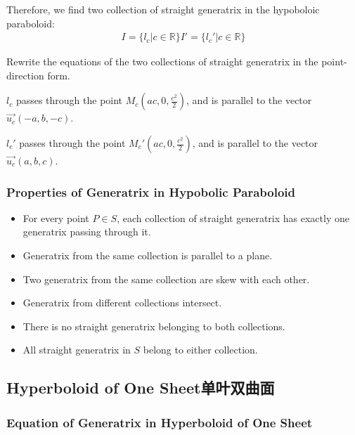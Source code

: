 \documentclass[onecolumn]{ctexart}
\begin{document}
Therefore, we find two collection of straight generatrix in the hypoboloic 
paraboloid:
\begin{equation}
  \begin{split}
    I = \lbrace l_c | c \in \mathbb{R} \rbrace
    I' = \lbrace l_c' | c \in \mathbb{R} \rbrace
  \end{split}
\end{equation}

Rewrite the equations of the two collections of straight generatrix in the
point-direction form.

$l_c$ passes through the point $M_c(ac, 0, \frac{c^2}{2})$, and is parallel to 
the vector $\vec{u_c}(-a, b, -c)$.

$l_c'$ passes through the point $M_c'(ac, 0, \frac{c^2}{2})$, and is parallel to 
the vector $\vec{u_c}(a, b, c)$.

\subsubsection{Properties of Generatrix in Hypobolic Paraboloid}
\begin{itemize}
  \item For every point $P \in S$, each collection of straight generatrix has 
  exactly one generatrix passing through it.
  \item Generatrix from the same collection is parallel to a plane.
  \item Two generatrix from the same collection are skew with each other.
  \item Generatrix from different collections intersect.
  \item There is no straight generatrix belonging to both collections.
  \item All straight generatrix in $S$ belong to either collection.
\end{itemize}

\subsection{Hyperboloid of One Sheet单叶双曲面}

\subsubsection{Equation of Generatrix in Hyperboloid of One Sheet}
\end{document}
